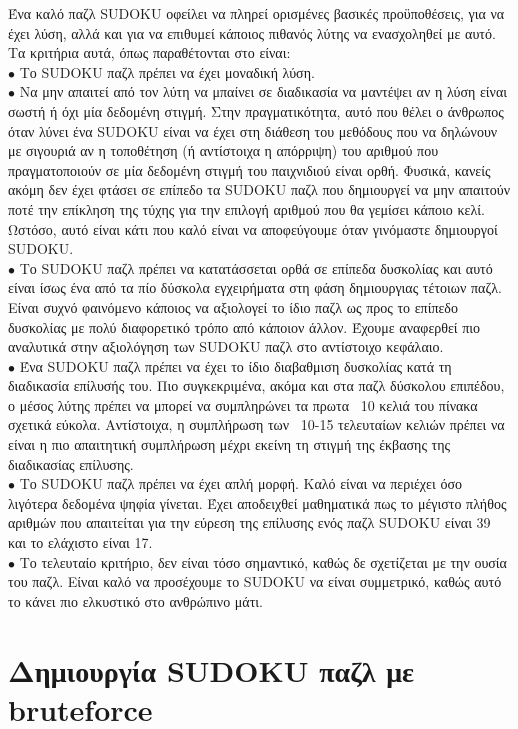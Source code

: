\documentclass[12pt]{book}
\theoremstyle{definition}
\begin{document}
Ένα καλό παζλ SUDOKU οφείλει να πληρεί ορισμένες βασικές προϋποθέσεις, για να έχει λύση, αλλά και για να επιθυμεί κάποιος πιθανός λύτης να ενασχοληθεί με αυτό. Τα κριτήρια αυτά, όπως παραθέτονται στο \cite{9} είναι: \\
\(\bullet\) Το SUDOKU παζλ πρέπει να έχει μοναδική λύση. \\
\(\bullet\) Να μην απαιτεί από τον λύτη να μπαίνει σε διαδικασία να μαντέψει αν η λύση είναι σωστή ή όχι μία δεδομένη στιγμή. Στην πραγματικότητα, αυτό που θέλει ο άνθρωπος όταν λύνει ένα SUDOKU είναι να έχει στη διάθεση του μεθόδους που να δηλώνουν με σιγουριά αν η τοποθέτηση (ή αντίστοιχα η απόρριψη) του αριθμού  που πραγματοποιούν σε μία δεδομένη στιγμή του παιχνιδιού είναι ορθή. Φυσικά, κανείς ακόμη δεν έχει φτάσει σε επίπεδο τα SUDOKU παζλ που δημιουργεί να μην απαιτούν ποτέ την επίκληση της τύχης για την επιλογή αριθμού που θα γεμίσει κάποιο κελί. Ωστόσο, αυτό είναι κάτι που καλό είναι να αποφεύγουμε όταν γινόμαστε δημιουργοί SUDOKU. \\
\(\bullet\) Το SUDOKU παζλ πρέπει να κατατάσσεται ορθά σε επίπεδα δυσκολίας και αυτό είναι ίσως ένα από τα πίο δύσκολα εγχειρήματα στη φάση δημιουργιας τέτοιων παζλ. Είναι συχνό φαινόμενο κάποιος να αξιολογεί το ίδιο παζλ ως προς το επίπεδο δυσκολίας με πολύ διαφορετικό τρόπο από κάποιον άλλον. Έχουμε αναφερθεί πιο αναλυτικά στην αξιολόγηση των SUDOKU παζλ στο αντίστοιχο κεφάλαιο. \\
\(\bullet\) Ένα SUDOKU παζλ πρέπει να έχει το ίδιο διαβαθμιση δυσκολίας κατά τη διαδικασία επίλυσής του. Πιο συγκεκριμένα, ακόμα και στα παζλ δύσκολου επιπέδου, ο μέσος λύτης πρέπει να μπορεί να συμπληρώνει τα πρωτα ~10 κελιά του πίνακα σχετικά εύκολα. Αντίστοιχα, η συμπλήρωση των ~10-15 τελευταίων κελιών πρέπει να είναι η πιο απαιτητική συμπλήρωση μέχρι εκείνη τη στιγμή της έκβασης της διαδικασίας επίλυσης. \\
\(\bullet\) Το SUDOKU παζλ πρέπει να έχει απλή μορφή. Καλό είναι να περιέχει όσο λιγότερα δεδομένα ψηφία γίνεται. Έχει αποδειχθεί μαθηματικά πως το μέγιστο πλήθος αριθμών που απαιτείται για την εύρεση της επίλυσης ενός παζλ SUDOKU είναι 39 και το ελάχιστο είναι 17. \\
\(\bullet\) Το τελευταίο κριτήριο, δεν είναι τόσο σημαντικό, καθώς δε σχετίζεται με την ουσία του παζλ. Είναι καλό να προσέχουμε το SUDOKU να είναι συμμετρικό, καθώς αυτό το κάνει πιο ελκυστικό στο ανθρώπινο μάτι. \par


\section{Δημιουργία SUDOKU παζλ με bruteforce}
\end{document}
